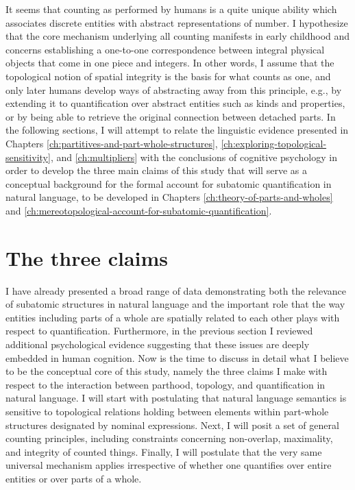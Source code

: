 It seems that counting as performed by humans is a quite unique ability which associates discrete entities with abstract representations of number. I hypothesize that the core  mechanism underlying all counting manifests in early childhood and concerns establishing a one-to-one correspondence between integral physical objects that come in one piece and integers. In other words, I assume that the topological notion of spatial integrity is the basis for what counts as one, and only later humans develop ways of abstracting away from this principle, e.g., by extending it to quantification over abstract entities such as kinds and properties, or by being able to retrieve the original connection between detached parts. In the following sections, I will attempt to relate the linguistic evidence presented in Chapters \ref{ch:partitives-and-part-whole-structures}, \ref{ch:exploring-topological-sensitivity}, and \ref{ch:multipliers} with the conclusions of cognitive psychology in order to develop the three main claims of this study that will serve as a conceptual background for the formal account for subatomic quantification in natural language, to be developed in Chapters \ref{ch:theory-of-parts-and-wholes} and \ref{ch:mereotopological-account-for-subatomic-quantification}.

\section{The three claims}\label{sec:the-three-claims}

I have already presented a broad range of data demonstrating both the relevance of subatomic structures in natural language and the important role that the way entities including parts of a whole are spatially related to each other plays with respect to quantification. Furthermore, in the previous section I reviewed additional psychological evidence suggesting that these issues are deeply embedded in human cognition. Now is the time to discuss in detail what I believe to be the conceptual core of this study, namely the three claims I make with respect to the interaction between parthood, topology, and quantification in natural language. I will start with postulating that natural language semantics is sensitive to topological relations holding between elements within part-whole structures designated by nominal expressions. Next, I will posit a set of general counting principles, including constraints concerning non-overlap, maximality, and integrity of counted things. Finally, I will postulate that the very same universal mechanism applies irrespective of whether one quantifies over entire entities or over parts of a whole.

